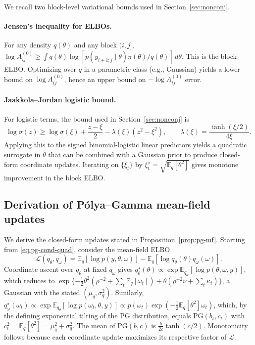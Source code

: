 We recall two block-level variational bounds used in Section~\ref{sec:nonconj}.

\paragraph{Jensen's inequality for ELBOs.}
For any density $q(\theta)$ and any block $(i,j]$,
$\log A^{(0)}_{ij}\ge \int q(\theta)\log[p(y_{i+1:j}\mid\theta)\pi(\theta)/q(\theta)]\,d\theta$.
This is the block ELBO. Optimizing over $q$ in a parametric class (e.g., Gaussian) yields a
lower bound on $\log A^{(0)}_{ij}$, hence an upper bound on $-\log A^{(0)}_{ij}$ error.

\paragraph{Jaakkola--Jordan logistic bound.}
For logistic terms, the bound used in Section~\ref{sec:nonconj} is
\[
\log\sigma(z)\ge \log\sigma(\xi)+\frac{z-\xi}{2}-\lambda(\xi)(z^2-\xi^2),
\qquad \lambda(\xi)=\frac{\tanh(\xi/2)}{4\xi}.
\]
Applying this to the signed binomial-logistic linear predictors yields a quadratic surrogate in
$\theta$ that can be combined with a Gaussian prior to produce closed-form coordinate updates.
Iterating on $\{\xi_t\}$ by $\xi_t^\star=\sqrt{\mathbb{E}_q[\theta^2]}$ gives monotone improvement
in the block ELBO.

\subsection{Derivation of P\'olya--Gamma mean-field updates}
\label{app:pg-mf-derivation}

We derive the closed-form updates stated in Proposition~\ref{prop:pg-mf}. Starting from
\eqref{eq:pg-cond-quad}, consider the mean-field ELBO
\[
\mathcal{L}(q_\theta,q_\omega)=\mathbb{E}_q[\log p(y,\theta,\omega)]-\mathbb{E}_q[\log q_\theta(\theta)q_\omega(\omega)].
\]
Coordinate ascent over $q_\theta$ at fixed $q_\omega$ gives $q_\theta^\star(\theta)\propto\exp\mathbb{E}_{q_\omega}[\log p(\theta,\omega,y)]$, which reduces to
$\exp\{-\tfrac12\theta^2(\rho^{-2}+\sum_t \mathbb{E}_q[\omega_t])+\theta(\rho^{-2}\nu+\sum_t \kappa_t)\}$, a Gaussian with the stated $(\mu_q,\sigma_q^2)$.
Similarly, $q_\omega^\star(\omega_t)\propto\exp\mathbb{E}_{q_\theta}[\log p(\omega_t,\theta,y)]\propto p(\omega_t)\exp(-\tfrac{1}{2}\mathbb{E}_q[\theta^2]\omega_t)$, which, by the defining exponential tilting of the PG distribution, equals $\mathrm{PG}(b_t,c_t)$ with $c_t^2=\mathbb{E}_q[\theta^2]=\mu_q^2+\sigma_q^2$. The mean of $\mathrm{PG}(b,c)$ is $\tfrac{b}{2c}\tanh(c/2)$. Monotonicity follows because each coordinate update maximizes its respective factor of $\mathcal{L}$.

